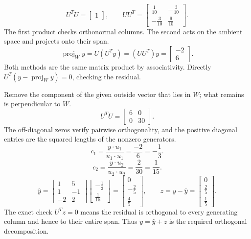 \[U^TU=\left[\begin{array}{r}1\end{array}\right],\qquad UU^T=\left[\begin{array}{rr}\frac{1}{10}&- \frac{3}{10}\\- \frac{3}{10}&\frac{9}{10}\end{array}\right].\]
The first product checks orthonormal columns. The second acts on the ambient space and projects onto their span.
\[\operatorname{proj}_Wy=U(U^Ty)=(UU^T)y=\left[\begin{array}{r}-2\\6\end{array}\right].\]
Both methods are the same matrix product by associativity. Directly $U^T(y-\operatorname{proj}_Wy)=0$, checking the residual.

\idea Remove the component of the given outside vector that lies in $W$; what remains is perpendicular to $W$.
\[U^TU=\left[\begin{array}{rr}6&0\\0&30\end{array}\right].\]
The off-diagonal zeros verify pairwise orthogonality, and the positive diagonal entries are the squared lengths of the nonzero generators.
\[c_{1}=\frac{y\cdot u_{1}}{u_{1}\cdot u_{1}}=\frac{-2}{6}=- \frac{1}{3}.\]
\[c_{2}=\frac{y\cdot u_{2}}{u_{2}\cdot u_{2}}=\frac{2}{30}=\frac{1}{15}.\]
\[\widehat y=\left[\begin{array}{rr}1&5\\1&-1\\-2&2\end{array}\right]\left[\begin{array}{r}- \frac{1}{3}\\\frac{1}{15}\end{array}\right]=\left[\begin{array}{r}0\\- \frac{2}{5}\\\frac{4}{5}\end{array}\right],\qquad z=y-\widehat y=\left[\begin{array}{r}0\\\frac{2}{5}\\\frac{1}{5}\end{array}\right].\]
The exact check $U^Tz=0$ means the residual is orthogonal to every generating column and hence to their entire span. Thus $y=\widehat y+z$ is the required orthogonal decomposition.

